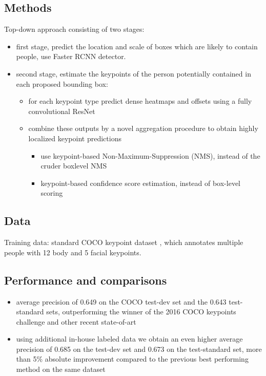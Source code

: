 \documentclass[runningheads,a4paper,11pt]{report}
\begin{document}
\subsection{Methods}
 Top-down approach consisting of two stages:
 \begin{itemize}
    \item first stage, predict the location and scale of boxes which are likely to contain people, use Faster RCNN detector.
    \item second stage, estimate the keypoints of the person potentially contained in each proposed bounding box:
        \begin{itemize}
            \item for each keypoint type predict dense heatmaps and offsets using a fully convolutional ResNet
            \item combine these outputs by a novel aggregation procedure to obtain highly localized keypoint predictions

             \begin{itemize}
             \item use keypoint-based Non-Maximum-Suppression (NMS), instead of the cruder boxlevel NMS
             \item keypoint-based confidence score estimation, instead of box-level scoring
    
             \end{itemize}
        \end{itemize}
 \end{itemize}


\subsection{Data}

Training data: standard COCO keypoint dataset \cite{coco2016}, which annotates multiple people with 12 body and 5 facial keypoints.


\subsection{Performance and comparisons}
\begin{itemize}
    \item average precision of 0.649 on the COCO test-dev set and the 0.643 test-standard sets, outperforming the winner of the 2016 COCO keypoints challenge and other recent state-of-art
    \item using additional in-house labeled data we obtain an even higher average precision of 0.685 on the test-dev set and 0.673 on the test-standard set, more than 5\% absolute improvement compared to the previous best performing method on the same dataset

\end{itemize}
\end{document}

